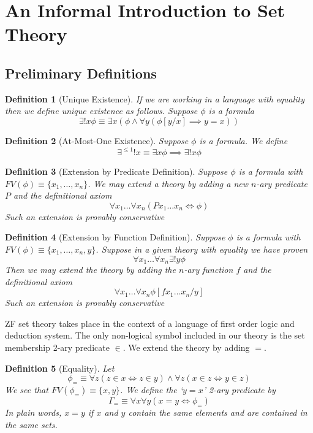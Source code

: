 \documentclass[12pt]{article}
\theoremstyle{break}
\newtheorem{definition}{Definition}[section]
\theoremstyle{break}
\theoremstyle{break}
\theoremstyle{break}
\theoremstyle{break}
\newtheorem{informal definition}[definition]{Informal Definition}
\begin{document}
\newpage
\section{An Informal Introduction to Set Theory}

\subsection{Preliminary Definitions}
\begin{definition}[Unique Existence]
If we are working in a language with equality then we define unique existence as follows.
Suppose $\phi$ is a formula
$$
\exists !x \phi \equiv \exists x(\phi \land \forall y (\phi[y/x] \implies y=x))
$$
\end{definition}

\begin{definition}[At-Most-One Existence]
Suppose $\phi$ is a formula. We define
$$
\exists^{\le 1}!x \equiv \exists x \phi \implies \exists!x \phi
$$
\end{definition}

\begin{definition}[Extension by Predicate Definition]
Suppose $\phi$ is a formula with $FV(\phi) \equiv \{x_1,\ldots, x_n\}$.
We may extend a theory by adding a new $n$-ary predicate $P$ and the definitional axiom
$$
\forall x_1 \ldots \forall x_n (Px_1\ldots x_n \iff \phi)
$$
Such an extension is provably conservative
\end{definition}

\begin{definition}[Extension by Function Definition]
Suppose $\phi$ is a formula with $FV(\phi)\equiv \{x_1,\ldots, x_n, y\}$.
Suppose in a given theory with equality we have proven
$$
\forall x_1 \ldots \forall x_n \exists! y \phi
$$
Then we may extend the theory by adding the $n$-ary function $f$ and the definitional axiom
$$
\forall x_1 \ldots \forall x_n \phi[fx_1\ldots x_n/y]
$$
Such an extension is provably conservative
\end{definition}

ZF set theory takes place in the context of a language of first order logic and deduction system.
The only non-logical symbol included in our theory is the set membership 2-ary predicate $\in$.
We extend the theory by adding $=$.

\begin{definition}[Equality]
Let
$$
\phi_= \equiv \forall z(z\in x \iff z \in y) \land \forall z (x\in z \iff y\in z)
$$
We see that $FV(\phi_=) \equiv \{x, y\}$.
We define the `$y=x$' 2-ary predicate by
$$
\Gamma_= \equiv \forall x \forall y (x=y \iff \phi_=)
$$
In plain words, $x=y$ if $x$ and $y$ contain the same elements and are contained in the same sets.
\end{definition}
\end{document}
